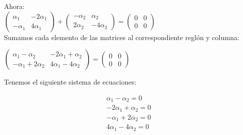 \documentclass[letterpaper]{article}
\renewcommand{\*}{\cdot}
\theoremstyle{definition}
\begin{document}
Ahora:\\

$\begin{pmatrix} \alpha_1 & -2\alpha_{1} \\ -\alpha_{1} & 4\alpha_{1} \end{pmatrix} +
\begin{pmatrix} -\alpha_{2} & \alpha_2 \\ 2\alpha_{2} & -4\alpha_{2} \end{pmatrix} = \begin{pmatrix} 	0 & 0 \\ 0 & 0 \end{pmatrix}$\\

Sumamos cada elemento de las matrices al correspondiente reglón y columna:\\

\begin{center}
	$\begin{pmatrix}
	\alpha_{1}-\alpha_{2} & -2\alpha_{1}+\alpha_{2} \\ -\alpha_{1}+2\alpha_{2} & 4\alpha_{1}-4\alpha_{2}
	\end{pmatrix} = \begin{pmatrix}
	0 & 0 \\ 0 & 0
	\end{pmatrix}$
\end{center}

Tenemos el siguiente sistema de ecuaciones:
\begin{center}
	\begin{align*}
	\alpha_{1}-\alpha_{2} = 0\\
	-2\alpha_{1} + \alpha_{2} = 0\\
	-\alpha_{1}+2\alpha_{2}= 0\\
	4\alpha_{1}-4\alpha_{2}= 0
	\end{align*}
\end{center}
\end{document}
